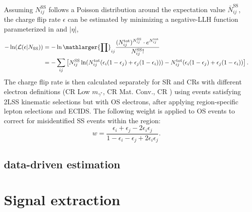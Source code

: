 \documentclass[../thesis.tex]{subfiles}
\begin{document}
Assuming $N_{ij}^\mathrm{SS}$ follows a Poisson distribution around the expectation value $\bar{N}_{ij}^\mathrm{SS}$, the charge flip rate $\epsilon$ can be estimated by minimizing a negative-LLH function parameterized in \pT and $|\eta|$,
\begin{align}
-\ln (\mathcal{L}(\epsilon | N_\mathrm{SS})) 
&= -\ln \mathlarger{\prod}_{ij} \frac{(N_{ij}^\mathrm{tot})^{N_{ij}^\mathrm{SS}} \cdot e^{N_{ij}^\mathrm{tot}}}{N_{ij}^\mathrm{SS}!} \\
&= -\sum_{ij} \left[
N_{ij}^\mathrm{SS} \ln (
N_{ij}^\mathrm{tot}( \epsilon_i(1-\epsilon_j)+\epsilon_j(1-\epsilon_i) )) - 
N_{ij}^\mathrm{tot}( \epsilon_i(1-\epsilon_j)+\epsilon_j(1-\epsilon_i) ) \right].
\end{align}
The charge flip rate is then calculated separately for SR and CRs with different electron definitions (CR Low $m_{\gamma^{*}}$, CR Mat. Conv., CR \ttW) using events satisfying 2LSS kinematic selections but with OS electrons, after applying region-specific lepton selections and ECIDS. The following weight is applied to OS events to correct for misidentified SS events within the region:
\begin{equation}
w = \frac{\epsilon_i+\epsilon_j-2\epsilon_i\epsilon_j}{1-\epsilon_i-\epsilon_j+2\epsilon_i\epsilon_j}.
\end{equation}

\subsection{\ttW data-driven estimation}


\section{Signal extraction}
\label{sec:mva}
\end{document}
